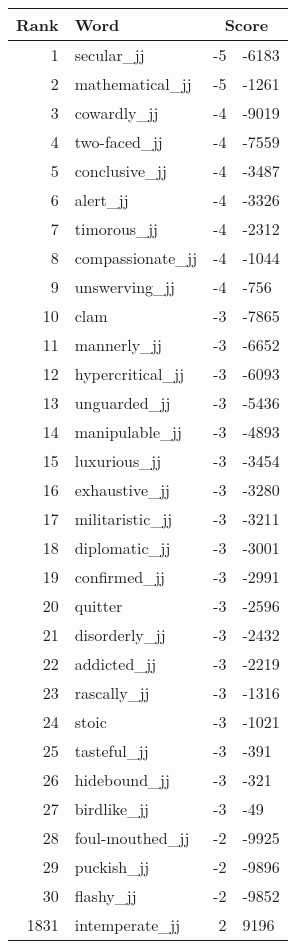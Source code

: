 \begin{longtable}[!htbp]{| rlr@{.}l |}
    \hline
    \textbf{Rank} & \textbf{Word} & \multicolumn{2}{c|}{\textbf{Score}} \\
    \hline
    \endhead
    1 & secular\_jj & -5 & -6183 \\
    2 & mathematical\_jj & -5 & -1261 \\
    3 & cowardly\_jj & -4 & -9019 \\
    4 & two-faced\_jj & -4 & -7559 \\
    5 & conclusive\_jj & -4 & -3487 \\
    6 & alert\_jj & -4 & -3326 \\
    7 & timorous\_jj & -4 & -2312 \\
    8 & compassionate\_jj & -4 & -1044 \\
    9 & unswerving\_jj & -4 & -756 \\
    10 & clam & -3 & -7865 \\
    11 & mannerly\_jj & -3 & -6652 \\
    12 & hypercritical\_jj & -3 & -6093 \\
    13 & unguarded\_jj & -3 & -5436 \\
    14 & manipulable\_jj & -3 & -4893 \\
    15 & luxurious\_jj & -3 & -3454 \\
    16 & exhaustive\_jj & -3 & -3280 \\
    17 & militaristic\_jj & -3 & -3211 \\
    18 & diplomatic\_jj & -3 & -3001 \\
    19 & confirmed\_jj & -3 & -2991 \\
    20 & quitter & -3 & -2596 \\
    21 & disorderly\_jj & -3 & -2432 \\
    22 & addicted\_jj & -3 & -2219 \\
    23 & rascally\_jj & -3 & -1316 \\
    24 & stoic & -3 & -1021 \\
    25 & tasteful\_jj & -3 & -391 \\
    26 & hidebound\_jj & -3 & -321 \\
    27 & birdlike\_jj & -3 & -49 \\
    28 & foul-mouthed\_jj & -2 & -9925 \\
    29 & puckish\_jj & -2 & -9896 \\
    30 & flashy\_jj & -2 & -9852 \\
    1831 & intemperate\_jj & 2 & 9196 \\

\end{longtable}
